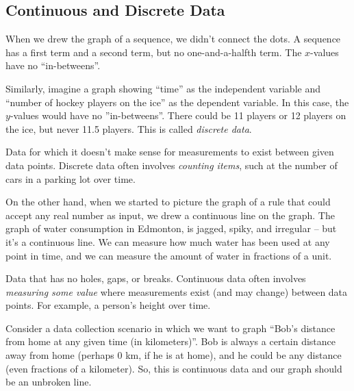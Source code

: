 \subsection{Continuous and Discrete Data}

When we drew the graph of a sequence, we didn't connect the dots. A sequence has a first term and a second term, but no one-and-a-halfth term. The $x$-values have no ``in-betweens''.

Similarly, imagine a graph showing ``time'' as the independent variable and ``number of hockey players on the ice'' as the dependent variable. In this case, the $y$-values would have no ''in-betweens''. There could be 11 players or 12 players on the ice, but never 11.5 players. This is called \textit{discrete data}.

\begin{boxeddef}
Data for which it doesn't make sense for measurements to exist between given data points. Discrete data often involves \textit{counting items}, such at the number of cars in a parking lot over time. 
\end{boxeddef}

On the other hand, when we started to picture the graph of a rule that could accept any real number as input, we drew a continuous line on the graph. The graph of water consumption in Edmonton, is jagged, spiky, and irregular -- but it's a continuous line. We can measure how much water has been used at any point in time, and we can measure the amount of water in fractions of a unit.

\begin{boxeddef}
Data that has no holes, gaps, or breaks. Continuous data often involves \textit{measuring some value} where measurements exist (and may change) between data points. For example, a person's height over time.
\end{boxeddef}


Consider a data collection scenario in which we want to graph ``Bob's distance from home at any given time (in kilometers)''. Bob is always a certain distance away from home (perhaps 0 km, if he is at home), and he could be any distance (even fractions of a kilometer). So, this is continuous data and our graph should be an unbroken line.

